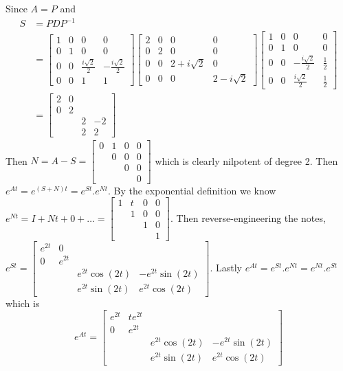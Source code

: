 Since $A = P$ and
\begin{align*}
    S &= PDP^{-1}\\
    &=  \begin{bmatrix}
        1&0&0&0\\
        0&1&0&0\\
        0&0&\frac{i\sqrt{2}}{2} & - \frac{i\sqrt{2}}{2} \\
        0&0&1&1
        \end{bmatrix} \begin{bmatrix}
        2 &0&0&0\\
        0&2&0&0\\
        0&0&2 + i \sqrt{2}&0\\
        0&0&0&2 - i \sqrt{2}
    \end{bmatrix}
    \begin{bmatrix}
        1&0&0&0\\
        0&1&0&0\\
        0&0&-\frac{i\sqrt{2}}{2} & \frac{1}{2}\\
        0&0&\frac{i\sqrt{2}}{2}&\frac{1}{2}
        \end{bmatrix}\\
        &= \begin{bmatrix}
            2&0&&\\
            0&2&&\\
            &&2&-2\\
            &&2&2
        \end{bmatrix}
\end{align*}
Then $N = A-S = \begin{bmatrix}
    0&1&0&0\\
    &0&0&0\\
    &&0&0\\
    &&&0
\end{bmatrix}$ which is clearly nilpotent of degree 2. Then $e^{At} = e^{(S+N)t} = e^{St}.e^{Nt}$. By the exponential definition we know $e^{Nt} = I + Nt + 0 +  \dots = \begin{bmatrix}
    1&t&0&0\\
    &1&0&0\\
    &&1&0\\
    &&&1
\end{bmatrix}$. Then reverse-engineering the notes, $e^{St} = \begin{bmatrix}
    e^{2t} & 0 & & \\
    0&e^{2t}&&\\
    &&e^{2t} \cos(2t) & -e^{2t}\sin(2t)\\
    &&e^{2t}\sin(2t) & e^{2t} \cos(2t) 
\end{bmatrix}$. Lastly $e^{At} = e^{St}.e^{Nt} = e^{Nt}.e^{St}$ which is 
$$e^{At} =  \begin{bmatrix}
    e^{2t} & te^{2t} & & \\
    0&e^{2t}&&\\
    &&e^{2t} \cos(2t) & -e^{2t}\sin(2t)\\
    &&e^{2t}\sin(2t) & e^{2t} \cos(2t) 
\end{bmatrix}$$